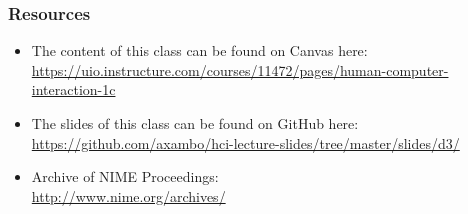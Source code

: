 \documentclass[screen, aspectratio=43]{beamer}
\begin{document}
%
\begin{frame}
\frametitle{Resources}
\begin{itemize}
\item The content of this class can be found on Canvas here:\\
\url{https://uio.instructure.com/courses/11472/pages/human-computer-interaction-1c}
\item The slides of this class can be found on GitHub here: \\
\url{https://github.com/axambo/hci-lecture-slides/tree/master/slides/d3/}
\item Archive of NIME Proceedings:\\
\url{http://www.nime.org/archives/}
\end{itemize}
\end{frame}
%
%
\end{document}
